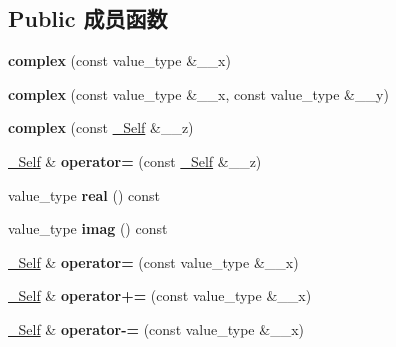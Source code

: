 \subsection*{Public 成员函数}
\begin{DoxyCompactItemize}
\item 
\mbox{\label{structcomplex_aa2bad7d595424b4c76abb250fb45edb0}} 
{\bfseries complex} (const value\+\_\+type \&\+\_\+\+\_\+x)
\item 
\mbox{\label{structcomplex_aae92a1f1c2b2333b70319b59f1300b0f}} 
{\bfseries complex} (const value\+\_\+type \&\+\_\+\+\_\+x, const value\+\_\+type \&\+\_\+\+\_\+y)
\item 
\mbox{\label{structcomplex_a3feaeed47b5153e84afc47e2e65fd8a2}} 
{\bfseries complex} (const \hyperlink{structcomplex}{\+\_\+\+Self} \&\+\_\+\+\_\+z)
\item 
\mbox{\label{structcomplex_a4043d74a14cbc67b616ec89e2c2f3f48}} 
\hyperlink{structcomplex}{\+\_\+\+Self} \& {\bfseries operator=} (const \hyperlink{structcomplex}{\+\_\+\+Self} \&\+\_\+\+\_\+z)
\item 
\mbox{\label{structcomplex_a9593813fe02e696f8cce33019c86e5fc}} 
value\+\_\+type {\bfseries real} () const
\item 
\mbox{\label{structcomplex_af609356fb494e9d731eafe233bd837b7}} 
value\+\_\+type {\bfseries imag} () const
\item 
\mbox{\label{structcomplex_a914372ebfaa7fc5fc96706c019abbeaa}} 
\hyperlink{structcomplex}{\+\_\+\+Self} \& {\bfseries operator=} (const value\+\_\+type \&\+\_\+\+\_\+x)
\item 
\mbox{\label{structcomplex_a9e33df875a66204d806b365ce7c8c176}} 
\hyperlink{structcomplex}{\+\_\+\+Self} \& {\bfseries operator+=} (const value\+\_\+type \&\+\_\+\+\_\+x)
\item 
\mbox{\label{structcomplex_aea4bbe74e111fce5534d68b763b6c4b5}} 
\hyperlink{structcomplex}{\+\_\+\+Self} \& {\bfseries operator-\/=} (const value\+\_\+type \&\+\_\+\+\_\+x)
\item 

\end{DoxyCompactItemize}
